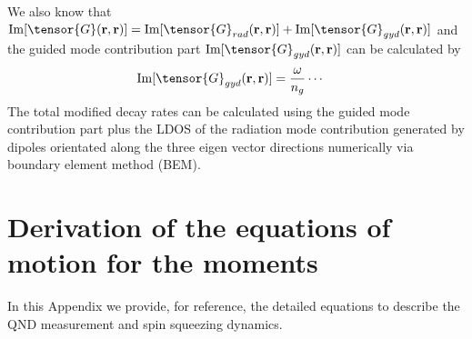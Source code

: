 \documentclass[preprint,aps,pra,onecolumn,superscriptaddress]{revtex4-1} %
\def\br{\mathbf{r}}
\begin{document}
\begin{appendix}
We also know that $\mathrm{Im}[\tensor{G}(\br,\br)]=\mathrm{Im}[\tensor{G}_{rad}(\br,\br)]+\mathrm{Im}[\tensor{G}_{gyd}(\br,\br)]$ and the guided mode contribution part $\mathrm{Im}[\tensor{G}_{gyd}(\br,\br)]$ can be calculated by
\begin{align}
\mathrm{Im}[\tensor{G}_{gyd}(\br,\br)] &= \frac{\omega}{n_g} \cdots
\end{align}
The total modified decay rates can be calculated using the guided mode contribution part plus the LDOS of the radiation mode contribution generated by dipoles orientated along the three eigen vector directions numerically via boundary element method (BEM).


\section{Derivation of the equations of motion for the moments} \label{Appendix::OpticalPumping}

In this Appendix we provide, for reference, the detailed equations to describe the QND measurement and spin squeezing dynamics.


\end{appendix}
\end{document}

